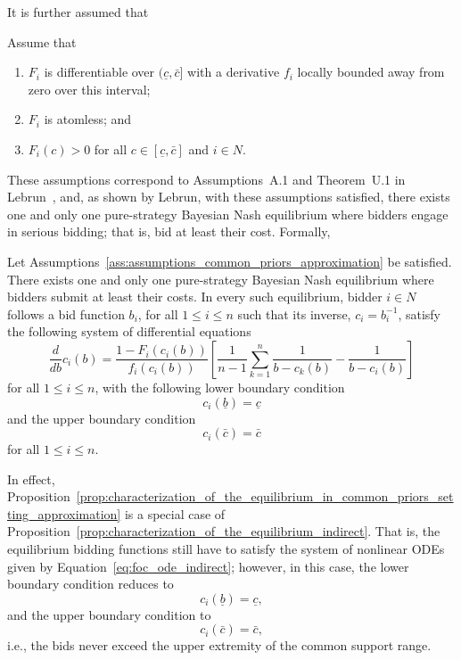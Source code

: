 It is further assumed that
\begin{assumptions}
\label{ass:assumptions_common_priors_approximation}
Assume that
\begin{enumerate}
  \item $F_i$ is differentiable over $(\underline{c}, \bar{c}]$ with a derivative $f_i$ locally bounded away from zero over this interval;
  \item $F_i$ is atomless; and
  \item $F_i(c)>0$ for all $c\in [\underline{c}, \bar{c}]$ and $i\in N$.
\end{enumerate}
\end{assumptions}
These assumptions correspond to Assumptions~A.1 and Theorem~U.1 in Lebrun~\cite{Lebrun2006}, and, as shown by Lebrun, with these assumptions satisfied, there exists one and only one pure-strategy Bayesian Nash equilibrium where bidders engage in serious bidding; that is, bid at least their cost. Formally,
\begin{proposition}
\label{prop:characterization_of_the_equilibrium_in_common_priors_setting_approximation}
Let Assumptions~\ref{ass:assumptions_common_priors_approximation} be satisfied. There exists one and only one pure-strategy Bayesian Nash equilibrium where bidders submit at least their costs. In every such equilibrium, bidder $i\in N$ follows a bid function $b_i$, for all $1\leq i\leq n$ such that its inverse, $c_i= b_i^{-1}$, satisfy the following system of differential equations
\begin{equation}
  \frac{d}{db}c_i(b) = \frac{1 - F_i(c_i(b))}{f_i(c_i(b))}\left[ \frac{1}{n-1}\sum_{k=1}^n \frac{1}{b-c_k(b)} - \frac{1}{b-c_i(b)} \right]
\end{equation}
for all $1\leq i\leq n$, with the following lower boundary condition
\begin{equation}
  \label{eq:foc_ode_lower_boundary_approximation}
  c_i(\underline{b}) = \underline{c}
\end{equation}
and the upper boundary condition
\begin{equation}
  \label{eq:foc_ode_upper_boundary_approximation}
  c_i(\bar{c}) = \bar{c}
\end{equation}
for all $1\leq i\leq n$.
\end{proposition}

In effect, Proposition~\ref{prop:characterization_of_the_equilibrium_in_common_priors_setting_approximation} is a special case of Proposition~\ref{prop:characterization_of_the_equilibrium_indirect}. That is, the equilibrium bidding functions still have to satisfy the system of nonlinear ODEs given by Equation~\eqref{eq:foc_ode_indirect}; however, in this case, the lower boundary condition reduces to
\begin{equation}
  c_i(\underline{b}) = \underline{c},
\end{equation}
and the upper boundary condition to
\begin{equation}
  c_i(\bar{c}) = \bar{c},
\end{equation}
i.e., the bids never exceed the upper extremity of the common support range.

